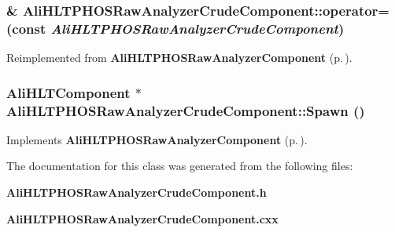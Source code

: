 \subsubsection{\& Ali\-HLTPHOSRaw\-Analyzer\-Crude\-Component::operator= (const  {\em Ali\-HLTPHOSRaw\-Analyzer\-Crude\-Component})\hspace{0.3cm}{\tt  [inline]}}\label{classAliHLTPHOSRawAnalyzerCrudeComponent_a3}




Reimplemented from {\bf Ali\-HLTPHOSRaw\-Analyzer\-Component} {\rm (p.\,\pageref{classAliHLTPHOSRawAnalyzerComponent_a3})}.
\subsubsection{\setlength{\rightskip}{0pt plus 5cm}Ali\-HLTComponent $\ast$ Ali\-HLTPHOSRaw\-Analyzer\-Crude\-Component::Spawn ()\hspace{0.3cm}{\tt  [virtual]}}\label{classAliHLTPHOSRawAnalyzerCrudeComponent_a5}




Implements {\bf Ali\-HLTPHOSRaw\-Analyzer\-Component} {\rm (p.\,\pageref{classAliHLTPHOSRawAnalyzerComponent_a11})}.

The documentation for this class was generated from the following files:\begin{CompactItemize}
\item 
{\bf Ali\-HLTPHOSRaw\-Analyzer\-Crude\-Component.h}\item 
{\bf Ali\-HLTPHOSRaw\-Analyzer\-Crude\-Component.cxx}\end{CompactItemize}
